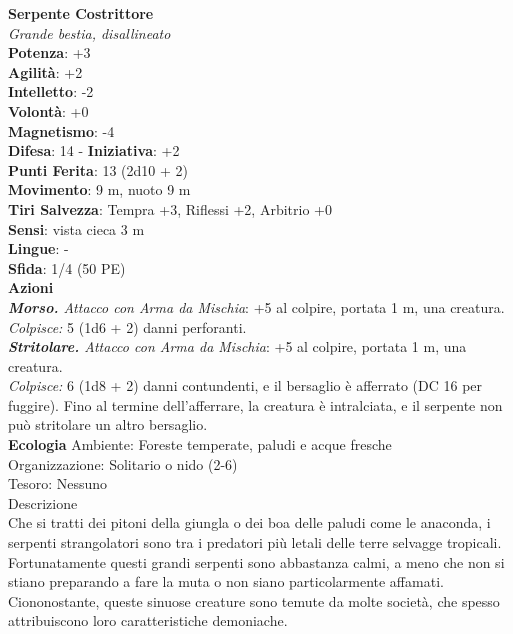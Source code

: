 \begin{multicols}{2}
\medskip\textbf{Serpente Costrittore}\\
\emph{Grande bestia, disallineato}\\
\textbf{Potenza}: +3\\
\textbf{Agilità}: +2\\
\textbf{Intelletto}: -2\\
\textbf{Volontà}: +0\\
\textbf{Magnetismo}: -4\\
\textbf{Difesa}: 14 - \textbf{Iniziativa}: +2\\
\textbf{Punti Ferita}: 13 (2d10 + 2)\\
\textbf{Movimento}: 9 m, nuoto 9 m\\
\textbf{Tiri Salvezza}: Tempra +3, Riflessi +2, Arbitrio +0\\
\textbf{Sensi}: vista cieca 3 m\\
\textbf{Lingue}: -\\
\textbf{Sfida}: 1/4 (50 PE)\smallskip\\
\smallskip\textbf{Azioni}\\
\emph{\textbf{Morso.} Attacco con Arma da Mischia}: +5 al colpire, portata 1 m, una creatura.\\
\emph{Colpisce:} 5 (1d6 + 2) danni perforanti.\\
\emph{\textbf{Stritolare.} Attacco con Arma da Mischia}: +5 al colpire, portata 1 m, una creatura.\\
\emph{Colpisce:} 6 (1d8 + 2) danni contundenti, e il bersaglio è afferrato (DC  16 per fuggire). Fino al termine dell'afferrare, la creatura è intralciata, e il serpente non può stritolare un altro bersaglio.\\
\textbf{Ecologia}
Ambiente: Foreste temperate, paludi e acque fresche\\
Organizzazione: Solitario o nido (2-6)\\
Tesoro: Nessuno\\
Descrizione\\
Che si tratti dei pitoni della giungla o dei boa delle paludi come le anaconda, i serpenti strangolatori sono tra i predatori più letali delle terre selvagge tropicali. Fortunatamente questi grandi serpenti sono abbastanza calmi, a meno che non si stiano preparando a fare la muta o non siano particolarmente affamati. Ciononostante, queste sinuose creature sono temute da molte società, che spesso attribuiscono loro caratteristiche demoniache.\\


\end{multicols}
